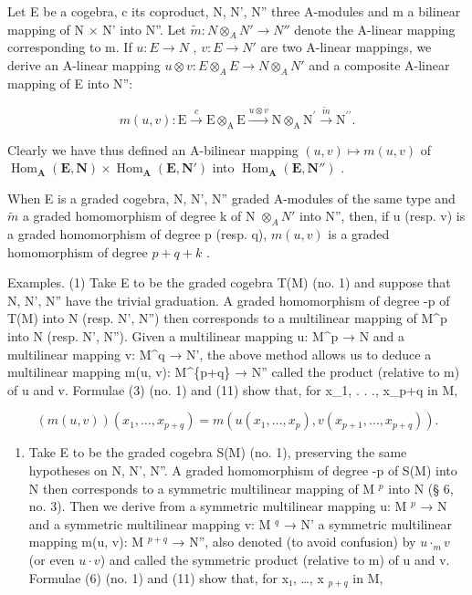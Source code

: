 Let E be a cogebra, c its coproduct, N, N', N'' three A-modules and m a bilinear mapping of N × N' into N''. Let \(\tilde{m}:N \otimes_{A} N' \to N''\) denote the A-linear mapping corresponding to m. If \(u:E \to N\) , \(v:E \to N'\) are two A-linear mappings, we derive an A-linear mapping \(u \otimes v:E \otimes_{A} E \to N \otimes_{A} N'\) and a composite A-linear mapping of E into N'':

\[
m (u, v): \mathrm{E} \xrightarrow {c} \mathrm{E} \otimes_ {\mathrm{A}} \mathrm{E} \xrightarrow {u \otimes v} \mathrm{N} \otimes_ {\mathrm{A}} \mathrm{N} ^ {\prime} \xrightarrow {\tilde {m}} \mathrm{N} ^ {\prime \prime}.\tag{11}
\]

Clearly we have thus defined an A-bilinear mapping \((u, v) \mapsto m(u, v)\) of \(\operatorname{Hom}_{\mathbf{A}}(\mathbf{E}, \mathbf{N}) \times \operatorname{Hom}_{\mathbf{A}}(\mathbf{E}, \mathbf{N}')\) into \(\operatorname{Hom}_{\mathbf{A}}(\mathbf{E}, \mathbf{N}'')\) .

When E is a graded cogebra, N, N', N'' graded A-modules of the same type and \(\tilde{m}\) a graded homomorphism of degree k of N \(\otimes_{A}N'\) into N'', then, if u (resp. v) is a graded homomorphism of degree p (resp. q), \(m(u,v)\) is a graded homomorphism of degree \(p + q + k\) .

Examples. (1) Take E to be the graded cogebra T(M) (no. 1) and suppose that N, N', N'' have the trivial graduation. A graded homomorphism of degree -p of T(M) into N (resp. N', N'') then corresponds to a multilinear mapping of M\^{}p into N (resp. N', N''). Given a multilinear mapping u: M\^{}p → N and a multilinear mapping v: M\^{}q → N', the above method allows us to deduce a multilinear mapping m(u, v): M\^{}\{p+q\} → N'' called the product (relative to m) of u and v. Formulae (3) (no. 1) and (11) show that, for x\_1, . . ., x\_p+q in M,

\[
(m (u, v)) \left(x _ {1}, \dots , x _ {p + q}\right) = m \left(u \left(x _ {1}, \dots , x _ {p}\right), v \left(x _ {p + 1}, \dots , x _ {p + q}\right)\right).
\]

\begin{enumerate}
\def\labelenumi{(\arabic{enumi})}
\setcounter{enumi}{1}
\tightlist
\item
  Take E to be the graded cogebra S(M) (no. 1), preserving the same hypotheses on N, N', N''. A graded homomorphism of degree -p of S(M) into N then corresponds to a symmetric multilinear mapping of M \(^{p}\) into N (§ 6, no. 3). Then we derive from a symmetric multilinear mapping u: M \(^{p}\) → N and a symmetric multilinear mapping v: M \(^{q}\) → N' a symmetric multilinear mapping m(u, v): M \(^{p+q}\) → N'', also denoted (to avoid confusion) by \(u \cdot_{m} v\) (or even \(u \cdot v\)) and called the symmetric product (relative to m) of u and v. Formulae (6) (no. 1) and (11) show that, for x₁, \ldots, x \(_{p+q}\) in M,
\end{enumerate}

